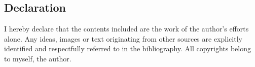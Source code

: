 \subsection*{Declaration}

I hereby declare that the contents included are the work of the author’s efforts alone.
Any ideas, images or text originating from other sources are explicitly identified and respectfully referred to in the bibliography.
All copyrights belong to myself, the author.

\vspace*{25pt}
\begin{flushright}
  \makeatletter
  \@author{} \\
  \@date{}
  \makeatother
\end{flushright}
